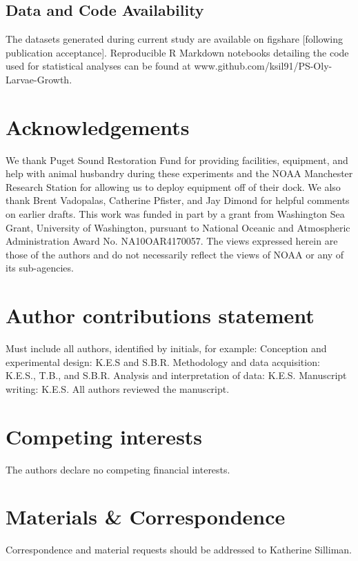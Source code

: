 \documentclass[fleqn,10pt]{wlscirep}
\begin{document}
\subsection*{Data and Code Availability}
The datasets generated during current study are available on figshare [following publication acceptance]. Reproducible R Markdown notebooks detailing the code used for statistical analyses can be found at www.github.com/ksil91/PS-Oly-Larvae-Growth.



\section*{Acknowledgements}

We thank Puget Sound Restoration Fund for providing facilities, equipment, and help with animal husbandry during these experiments and the NOAA Manchester Research Station for allowing us to deploy equipment off of their dock. We also thank Brent Vadopalas, Catherine Pfister, and Jay Dimond for helpful comments on earlier drafts. This work was funded in part by a grant from Washington Sea Grant, University of Washington, pursuant to National Oceanic and Atmospheric Administration Award No. NA10OAR4170057. The views expressed herein are those of the authors and do not necessarily reflect the views of NOAA or any of its sub-agencies.

\section*{Author contributions statement}

Must include all authors, identified by initials, for example:
Conception and experimental design: K.E.S and S.B.R. Methodology and data acquisition: K.E.S., T.B., and S.B.R. Analysis and interpretation of data: K.E.S. Manuscript writing: K.E.S. All authors reviewed the manuscript. 

\section*{Competing interests}
The authors declare no competing financial interests.

\section*{Materials \& Correspondence}
Correspondence and material requests should be addressed to Katherine Silliman.
\end{document}
